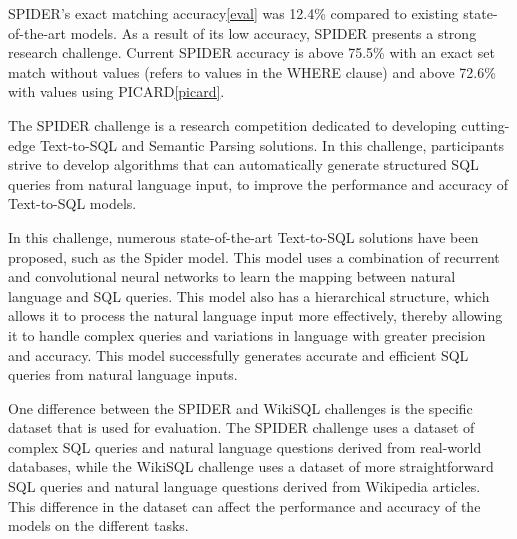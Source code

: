 


SPIDER's exact matching accuracy\ref{eval} was 12.4\% compared to existing state-of-the-art models. As a result of its low accuracy, SPIDER presents a strong research challenge. Current SPIDER accuracy is above 75.5\% with an exact set match without values (refers to values in the WHERE clause) and above 72.6\% with values using PICARD\ref{picard}.

The SPIDER challenge is a research competition dedicated to developing cutting-edge Text-to-SQL and Semantic Parsing solutions. In this challenge, participants strive to develop algorithms that can automatically generate structured SQL queries from natural language input, to improve the performance and accuracy of Text-to-SQL models.

In this challenge, numerous state-of-the-art Text-to-SQL solutions have been proposed, such as the Spider model. This model uses a combination of recurrent and convolutional neural networks to learn the mapping between natural language and SQL queries. This model also has a hierarchical structure, which allows it to process the natural language input more effectively, thereby allowing it to handle complex queries and variations in language with greater precision and accuracy. This model successfully generates accurate and efficient SQL queries from natural language inputs.

One difference between the SPIDER and WikiSQL challenges is the specific dataset that is used for evaluation. The SPIDER challenge uses a dataset of complex SQL queries and natural language questions derived from real-world databases, while the WikiSQL challenge uses a dataset of more straightforward SQL queries and natural language questions derived from Wikipedia articles. This difference in the dataset can affect the performance and accuracy of the models on the different tasks.

